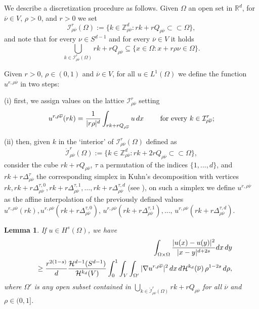 \documentclass{article}
\newtheorem{lemma}{Lemma}%
\begin{document}
\smallskip
We describe a discretization procedure as follows. Given $\Omega$ an open set in $\mathbb R^d$, for $\overline{\nu}\in V$, $\rho>0$, and $r>0$ we set
\[
\mathcal{I}^r_{\rho\overline{\nu}}(\Omega):=\{k\in \mathbb Z_{\rho\overline{\nu}}^d : rk+rQ_{\rho\overline{\nu}} \subset \subset \Omega\},
\]
and note that for every $\nu\in S^{d-1}$ and  for every $\overline{\nu}\in V$ it holds
\[
\bigcup_{k\in \mathcal{I}^r_{\rho \overline{\nu}}(\Omega)} rk+rQ_{\rho\overline{\nu}} \subseteq \{x\in \Omega : x+r\rho\nu\in\Omega\}.
\]

Given  $r>0$, $\rho\in (0,1)$ and $\overline{\nu}\in V$, for all $u\in L^1(\Omega)$ we define the function $u^{r,\rho\overline{\nu}}$ in two steps:

    (i) first, we assign values on the lattice $\mathcal{I}^r_{\rho\overline{\nu}}$ setting
    \[
    u^{r,\rho\overline{\nu}}(rk)= \displaystyle \frac{1}{|r\rho|^d}\int_{rk+rQ_{\rho\overline{\nu}}} u\,dx \qquad \hbox{ for every } k\in \mathcal{I}^r_{\rho\overline{\nu}};
    \] 
    
    (ii) then, given $k$ in the `interior' of  $\mathcal{I}^r_{\rho\overline{\nu}}(\Omega)$ defined as
    \[
{\mathring{\mathcal I}}^r_{\rho\overline{\nu}}(\Omega):=\{k\in \mathbb Z_{\rho\overline{\nu}}^d : rk+2rQ_{\rho\overline{\nu}} \subset \subset \Omega\},
\]
consider the cube $rk+rQ_{\rho\overline{\nu}}$, $\tau$ 
a permutation of the indices $\{1,...,d\}$, and $rk+r\Delta^\tau_{\rho\overline{\nu}}$ the corresponding simplex in Kuhn's decomposition with vertices $rk, rk+r\Delta^{\tau,0}_{\rho\overline{\nu}},rk+r\Delta^{\tau, 1}_{\rho\overline{\nu}},\ldots, rk+r\Delta^{\tau, d}_{\rho\overline{\nu}}$ (see \cite[Lemma 1]{Kuhn1960}), on such a simplex we define $u^{r,\rho\overline{\nu}}$ as the affine interpolation of the previously defined values $u^{r,\rho \overline{\nu}}(rk), u^{r,\rho \overline{\nu}}(rk+r\Delta^{\tau,0}_{\rho\overline{\nu}}),\, u^{r,\rho\overline{\nu}}(rk+r\Delta^{\tau, 1}_{\rho\overline{\nu}}),..., \,u^{r,\rho\overline{\nu}}(rk+r\Delta^{\tau, d}_{\rho\overline{\nu}})$.


\begin{lemma}\label{lemma-1}
 If $u\in H^s(\Omega)$, we have 
\begin{eqnarray*} &&\hskip-1cm
\int_{\Omega\times\Omega} \frac{|u(x)-u(y)|^2}{|x-y|^{d+2s}} dx\,dy \\
&& \ge \frac{r^{2(1-s)}}{d} \frac{\mathcal H^{d-1}(S^{d-1})}{\mathcal{H}^{k_d}(V)} \int_0^1\int_V \int_{\Omega'}  |\nabla u^{r,\rho\overline{\nu}}|^2\,dx\,   d\mathcal{H}^{k_d}(\overline{\nu})\,\rho^{1-2s}\, d\rho,
\end{eqnarray*}
where $\Omega'$ is any open subset contained in $\bigcup_{k \in {\mathring{\mathcal I}}^r_{\rho\overline{\nu}}(\Omega)} rk+rQ_{\rho\overline{\nu}}$ for all $\overline \nu$ and $\rho\in(0,1]$.
\end{lemma}
\end{document}
